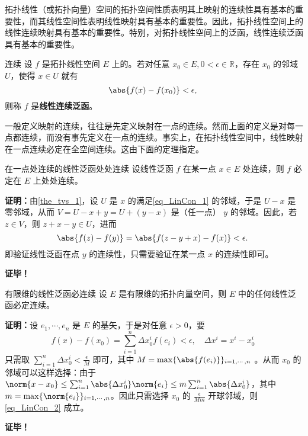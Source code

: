 
拓扑线性（或拓扑向量）空间的拓扑空间性质表明其上映射的连续性具有基本的重要性，而其线性空间性表明线性映射具有基本的重要性。因此，拓扑线性空间上的线性连续映射具有基本的重要性。特别，对拓扑线性空间上的泛函，线性连续泛函具有基本的重要性。
\begin{definition}{连续}
设 $f$ 是拓扑线性空间 $E$ 上的。若对任意 $x_0\in E,0<\epsilon\in\mathbb R$，存在 $x_0$ 的邻域 $U$，使得 $x\in U$ 就有
\begin{equation}\label{eq_LinCon_1}
\abs{f(x)-f(x_0)}<\epsilon,~
\end{equation}
则称 $f$ 是\textbf{线性连续泛函}。
\end{definition}

一般定义映射的连续，往往是先定义映射在一点的连续。然而上面的定义是对每一点都连续，而没有事先定义在一点的连续。事实上，在拓扑线性空间中，线性映射在一点连续必定在全空间连续。这由下面的定理指定。
\begin{theorem}{在一点处连续的线性泛函处处连续}
设线性泛函 $f$ 在某一点 $x\in E$ 处连续，则 $f$ 必定在 $E$ 上处处连续。
\end{theorem}
\textbf{证明：}由\autoref{the_tvs_1}，设 $U$ 是 $x$ 的满足\autoref{eq_LinCon_1} 的邻域，于是 $U-x$ 是零邻域，从而 $V=U-x+y=U+(y-x)$ 是（任一点） $y$ 的邻域。因此，若 $z\in V$，则 $z+x-y\in U$，进而
\begin{equation}
\abs{f(z)-f(y)}=\abs{f(z-y+x)-f(x)}<\epsilon.~
\end{equation}
即验证线性泛函在点 $y$ 的连续性，只需要验证在某一点 $x$ 的连续性即可。

\textbf{证毕！}

\begin{theorem}{有限维的线性泛函必连续}
设 $E$ 是有限维的拓扑向量空间，则 $E$ 中的任何线性泛函必定连续。
\end{theorem}
\textbf{证明：}设 $e_1,\cdots,e_n$ 是 $E$ 的基矢，于是对任意 $\epsilon>0$，要
\begin{equation}\label{eq_LinCon_2}
f(x)-f(x_0)=\sum_{i=1}^n\Delta x_0^i f(e_i)<\epsilon,\quad\Delta x^i=x^i-x^i_0~
\end{equation}
 只需取 $\sum_{i=1}^n\Delta x_0^i<\frac{\epsilon}{M}$ 即可，其中 $M=\max\{\abs{f(e_i)}\}_{i=1,\cdots,n}$ 。从而 $x_0$ 的邻域可以这样选择：由于 $\norm{x-x_0}\leq\sum_{i=1}^n\abs{\Delta x_0^i}\norm{e_i}\leq m\sum_{i=1}^n\abs{\Delta x_0^i}$，其中 $m=\max\{\norm{e_i}\}_{i=1,\cdots,n}$。因此只需选择 $x_0$ 的 $\frac{\epsilon}{Mm}$ 开球邻域，则\autoref{eq_LinCon_2} 成立。


\textbf{证毕！}



